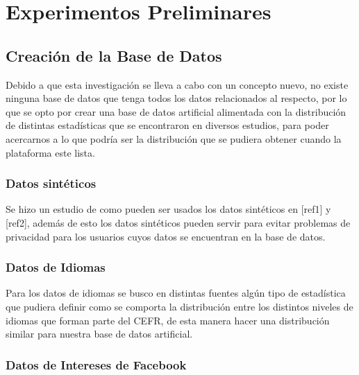 \chapter{Experimentos Preliminares}
\label{chapter:chapter04}

\section{Creación de la Base de Datos}

Debido a que esta investigación se lleva a cabo con un concepto nuevo, no existe ninguna base de datos que tenga todos los datos relacionados al respecto, por lo que se opto por crear una base de datos artificial alimentada con la distribución de distintas estadísticas que se encontraron en diversos estudios, para poder acercarnos a lo que podría ser la distribución que se pudiera obtener cuando la plataforma este lista.

\subsection{Datos sintéticos}

Se hizo un estudio de como pueden ser usados los datos sintéticos en [ref1] y [ref2], además de esto los datos sintéticos pueden servir para evitar problemas de privacidad para los usuarios cuyos datos se encuentran en la base de datos.

\subsection{Datos de Idiomas} 

Para los datos de idiomas se busco en distintas fuentes algún tipo de estadística que pudiera definir como se comporta la distribución entre los distintos niveles de idiomas que forman parte del CEFR, de esta manera hacer una distribución similar para nuestra base de datos artificial.

\subsection{Datos de Intereses de Facebook} 

